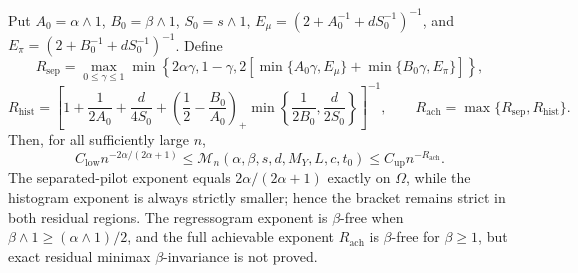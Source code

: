 Put \(A_0=\alpha\wedge1\), \(B_0=\beta\wedge1\), \(S_0=s\wedge1\), \(E_\mu=(2+A_0^{-1}+dS_0^{-1})^{-1}\), and \(E_\pi=(2+B_0^{-1}+dS_0^{-1})^{-1}\). Define
\[
R_{\mathrm{sep}}=\max_{0\le\gamma\le1}\min\left\{2\alpha\gamma,1-\gamma,2\left[\min\{A_0\gamma,E_\mu\}+\min\{B_0\gamma,E_\pi\}\right]\right\},
\]
\[
R_{\mathrm{hist}}=\left[1+\frac1{2A_0}+\frac d{4S_0}+\left(\frac12-\frac{B_0}{A_0}\right)_+\min\left\{\frac1{2B_0},\frac d{2S_0}\right\}\right]^{-1},
\qquad R_{\mathrm{ach}}=\max\{R_{\mathrm{sep}},R_{\mathrm{hist}}\}.
\]
Then, for all sufficiently large \(n\),
\[
C_{\mathrm{low}}n^{-2\alpha/(2\alpha+1)}
\le\mathcal M_n(\alpha,\beta,s,d,M_Y,L,c,t_0)
\le C_{\mathrm{up}}n^{-R_{\mathrm{ach}}}.
\]
The separated-pilot exponent equals \(2\alpha/(2\alpha+1)\) exactly on \(\Omega\), while the histogram exponent is always strictly smaller; hence the bracket remains strict in both residual regions. The regressogram exponent is \(\beta\)-free when \(\beta\wedge1\ge(\alpha\wedge1)/2\), and the full achievable exponent \(R_{\mathrm{ach}}\) is \(\beta\)-free for \(\beta\ge1\), but exact residual minimax \(\beta\)-invariance is not proved.